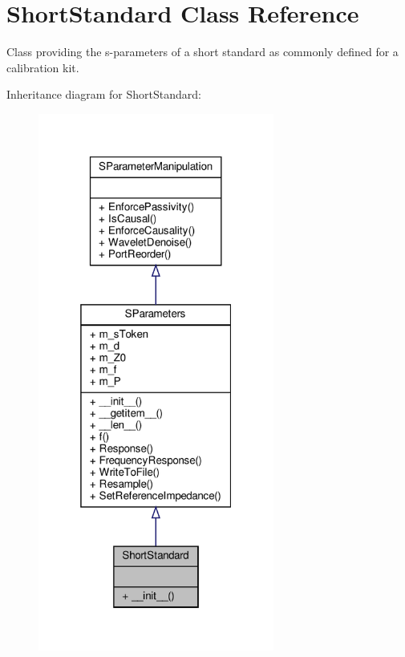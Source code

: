 \hypertarget{classSignalIntegrity_1_1Measurement_1_1CalKit_1_1Standards_1_1ShortStandard_1_1ShortStandard}{}\section{Short\+Standard Class Reference}
\label{classSignalIntegrity_1_1Measurement_1_1CalKit_1_1Standards_1_1ShortStandard_1_1ShortStandard}


Class providing the s-\/parameters of a short standard as commonly defined for a calibration kit.  




Inheritance diagram for Short\+Standard\+:\nopagebreak
\begin{figure}[H]
\begin{center}
\leavevmode
\includegraphics[width=220pt]{classSignalIntegrity_1_1Measurement_1_1CalKit_1_1Standards_1_1ShortStandard_1_1ShortStandard__inherit__graph}
\end{center}
\end{figure}


